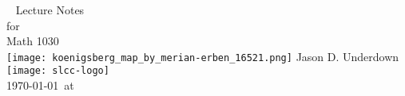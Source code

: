 \begin{titlepage}
  {~}
  \centering
  {\Huge Lecture Notes}\\[\baselineskip]
  {\LARGE for}\\[\baselineskip]
  {\Huge Math 1030}\\
  \vfill
  {\texttt{[image: koenigsberg\_map\_by\_merian-erben\_16521.png]}}
  \vfill
  {\Large Jason D. Underdown}\\[\baselineskip]
  {\texttt{[image: slcc-logo]}}\\[\baselineskip]
  {\large \today\ at \DTMcurrenttime{} }\\
\end{titlepage}

